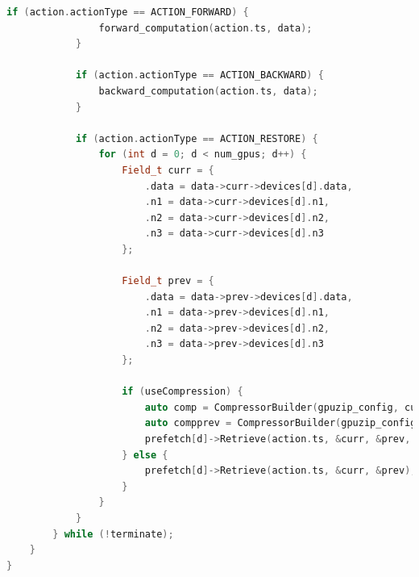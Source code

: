 \documentclass[Ingles,Final]{ic-tese-v3}
\begin{document}
\begin{appendices}{}
\begin{lstlisting}[language=C++, caption={Example of multi-GPU adjoint computation with GPUZIP}, label={lst:adjoint}]
            if (action.actionType == ACTION_FORWARD) {
                forward_computation(action.ts, data);
            }

            if (action.actionType == ACTION_BACKWARD) {
                backward_computation(action.ts, data);
            }

            if (action.actionType == ACTION_RESTORE) {
                for (int d = 0; d < num_gpus; d++) {
                    Field_t curr = {
                        .data = data->curr->devices[d].data,
                        .n1 = data->curr->devices[d].n1,
                        .n2 = data->curr->devices[d].n2,
                        .n3 = data->curr->devices[d].n3
                    };

                    Field_t prev = {
                        .data = data->prev->devices[d].data,
                        .n1 = data->prev->devices[d].n1,
                        .n2 = data->prev->devices[d].n2,
                        .n3 = data->prev->devices[d].n3
                    };

                    if (useCompression) {
                        auto comp = CompressorBuilder(gpuzip_config, curr.n1, curr.n2, curr.n3);
                        auto compprev = CompressorBuilder(gpuzip_config, prev.n1, prev.n2, prev.n3);
                        prefetch[d]->Retrieve(action.ts, &curr, &prev, comp.get(), compprev.get());
                    } else {
                        prefetch[d]->Retrieve(action.ts, &curr, &prev);
                    }
                }
            }
        } while (!terminate);
    }
}
\end{lstlisting}



\end{appendices}
\end{document}
